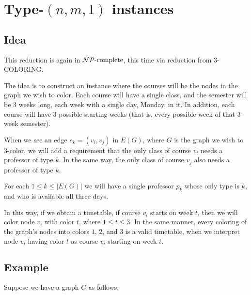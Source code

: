 \section{Type-$(n, m, 1)$ instances}
\subsection{Idea}
This reduction is again in $\mathcal{NP}{\text{-complete}}$, this time via reduction from 3-COLORING\cite{Garey:1990:CIG:574848}.

The idea is to construct an instance where the courses will be the nodes in the graph we wish to color. Each course will have a single class, and the semester will be 3 weeks long, each week with a single day, Monday, in it. In addition, each course will have 3 possible starting weeks (that is, every possible week of that 3-week semester).

When we see an edge $e_k = (v_i, v_j)$ in $E(G)$, where $G$ is the graph we wish to 3-color, we will add a requirement that the only class of course $v_i$ needs a professor of type $k$. In the same way, the only class of course $v_j$ also needs a professor of type $k$.

For each $1 \le k \le |E(G)|$ we will have a single professor $p_k$ whose only type is $k$, and who is available all three days.

In this way, if we obtain a timetable, if course $v_i$ starts on week $t$, then we will color node $v_i$ with color $t$, where $1 \le t \le 3$. In the same manner, every coloring of the graph's nodes into colors $1$, $2$, and $3$ is a valid timetable, when we interpret node $v_i$ having color $t$ as course $v_i$ starting on week $t$.

\subsection{Example}
Suppose we have a graph $G$ as follows:

\begin{center}
\end{center}

